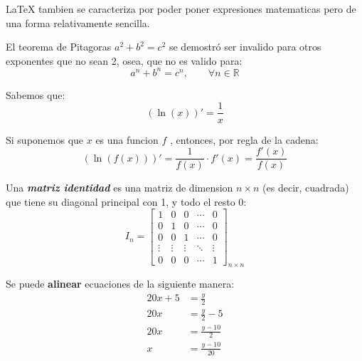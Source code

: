 \documentclass[12pt]{article}
\begin{document}
    \LaTeX{} tambien se caracteriza por poder poner expresiones matematicas
    pero de una forma relativamente sencilla.

    El teorema de Pitagoras \( a^2 + b^2 = c^2 \) se demostró ser invalido para otros
    exponentes que no sean 2, osea, que no es valido para:
    \[ a^n + b^n = c^n, \qquad \forall n \in \mathbb{R} \]

    Sabemos que:
    \[ ( \ln(x) )' = \frac{1}{x} \]

    Si suponemos que \(x\) es una funcion \(f\) , entonces, por regla de la cadena:
    \[ ( \ln( f(x) ) )' = \frac{1}{ f(x) } \cdot f'(x) = \frac{ f'(x) }{ f(x) } \]

    Una \textbf{\textit{matriz identidad}} es una matriz de dimension \(n \times n\) (es decir,
    cuadrada) que tiene su diagonal principal con 1, y todo el resto 0:
    \[
        I_n =
        \left[\begin{matrix}
            1      & 0      & 0      & \cdots & 0      \\
            0      & 1      & 0      & \cdots & 0      \\
            0      & 0      & 1      & \cdots & 0      \\
            \vdots & \vdots & \vdots & \ddots & \vdots \\
            0      & 0      & 0      & \cdots & 1
        \end{matrix}\right]_{n \times n}
    \]

    Se puede \textbf{alinear} ecuaciones de la siguiente manera:
    \begin{align*}
        20x + 5 &= \frac{y}{2}      \\
            20x &= \frac{y}{2} - 5  \\
            20x &= \frac{y - 10}{2} \\
              x &= \frac{y - 10}{20}
    \end{align*}
\end{document}
